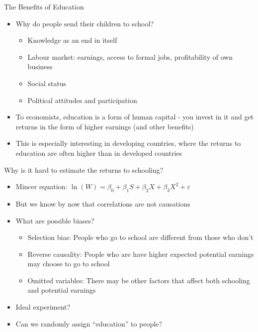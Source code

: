 \documentclass[11pt,notes=hide,aspectratio=169,mathserif]{beamer}
\begin{document}
\begin{frame}{The Benefits of Education}
\begin{itemize}
\item Why do people send their children to school?
\begin{itemize}
    \item  Knowledge as an end in itself
    \item  Labour market: earnings, access to formal jobs, profitability of own business
    \item  Social status
    \item  Political attitudes and participation
\end{itemize}
\item  To economists, education is a form of human capital - you invest in it and get returns in the form of higher earnings (and other benefits)
\item  This is especially interesting in developing countries, where the returns to education are often higher than in developed countries
\end{itemize}
\end{frame}

\begin{frame}{Why is it hard to estimate the returns to schooling?}
\begin{itemize}
\item Mincer equation: $\ln(W) = \beta_0 + \beta_1 S + \beta_2 X + \beta_3 X^2 + \varepsilon$
\item But we know by now that correlations are not causations
\item What are possible biases? 
\begin{itemize}
\item  Selection bias: People who go to school are different from those who don't
\item  Reverse causality: People who are have higher expected potential earnings may choose to go to school 
\item  Omitted variables: There may be other factors that affect both schooling and potential earnings
\end{itemize}
\item  Ideal experiment?
\item  Can we randomly assign ``education'' to people? 
\end{itemize}
\end{frame}
\end{document}
